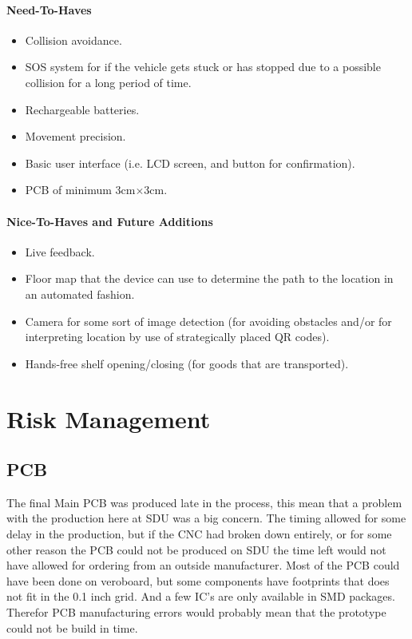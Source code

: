 \documentclass[11pt]{article}
\begin{document}
\paragraph{Need-To-Haves}
\begin{itemize}
\item{Collision avoidance.}
\item{SOS system for if the vehicle gets stuck or has stopped due to a possible collision for a long period of time.}
\item{Rechargeable batteries.}
\item{Movement precision.}
\item{Basic user interface (i.e. LCD screen, and button for confirmation).}
\item{PCB of minimum 3cm$\times$3cm.}
\end{itemize}
\paragraph{Nice-To-Haves and Future Additions}
\begin{itemize}
\item{Live feedback.}
\item{Floor map that the device can use to determine the path to the location in an automated fashion.}
\item{Camera for some sort of image detection (for avoiding obstacles and/or for interpreting location by use of strategically placed QR codes).}
\item{Hands-free shelf opening/closing (for goods that are transported).}
\end{itemize}
\newpage
\section{Risk Management}
\subsection*{PCB}
The final Main PCB was produced late in the process, this mean that a problem with the production here at SDU was a big concern. The timing allowed for some delay in the production, but if the CNC had broken down entirely, or for some other reason the PCB could not be produced on SDU the time left would not have allowed for ordering from an outside manufacturer. Most of the PCB could have been done on veroboard, but some components have footprints that does not fit in the 0.1 inch grid. And a few IC’s are only available in SMD packages. Therefor PCB manufacturing errors would probably mean that the prototype could not be build in time.
\end{document}
